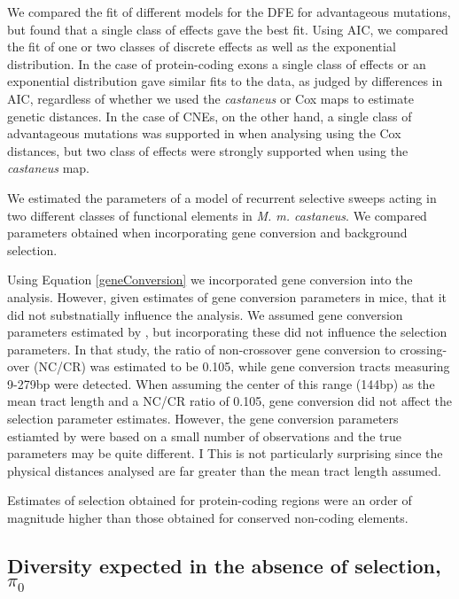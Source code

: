\documentclass[11pt]{article}
\begin{document}
	We compared the fit of different models for the DFE for advantageous mutations, but found that a single class of effects gave the best fit. Using AIC, we compared the fit of one or two classes of discrete effects as well as the exponential distribution. In the case of protein-coding exons a single class of effects or an exponential distribution gave similar fits to the data, as judged by differences in AIC, regardless of whether we used the \textit{castaneus} or Cox maps to estimate genetic distances. In the case of CNEs, on the other hand, a single class of advantageous mutations was supported in when analysing using the Cox distances, but two class of effects were strongly supported when using the \textit{castaneus} map. 

	We estimated the parameters of a model of recurrent selective sweeps acting in two different classes of functional elements in \textit{M. m. castaneus}. We compared parameters obtained when incorporating gene conversion and background selection.
	
	Using  Equation \ref{geneConversion} we incorporated gene conversion into the analysis. However, given estimates of gene conversion parameters in mice, that it did not substnatially influence the analysis. We assumed gene conversion parameters estimated by \cite{RN263}, but incorporating these did not influence the selection parameters. In that study, the ratio of non-crossover gene conversion to crossing-over (NC/CR) was estimated to be 0.105, while gene conversion tracts measuring 9-279bp were detected. When assuming the center of this range (144bp) as the mean tract length and a NC/CR ratio of 0.105, gene conversion did not affect the selection parameter estimates. However, the gene conversion parameters estiamted by \cite{RN263} were based on a small number of observations and the true parameters may be quite different. I
	This is not particularly surprising since the physical distances analysed are far greater than the mean tract length assumed.  

Estimates of selection obtained for protein-coding regions were an order of magnitude higher than those obtained for conserved non-coding elements. 

\subsection*{Diversity expected in the absence of selection, $\pi_0$}
\end{document}

